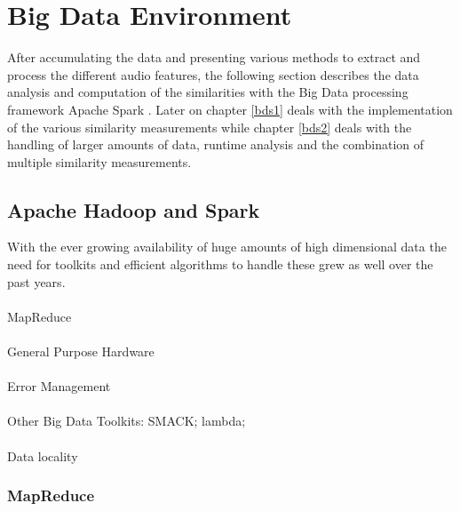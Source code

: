 
\section{Big Data Environment}\label{bdf}

After accumulating the data and presenting various methods to extract and process the different audio features, the following section describes the data analysis and computation of the similarities with the Big Data processing framework Apache Spark \cite{spark}. Later on chapter \ref{bds1} deals with the implementation of the various similarity measurements while chapter \ref{bds2} deals with the handling of larger amounts of data, runtime analysis and the combination of multiple similarity measurements. 

\subsection{Apache Hadoop and Spark} 

With the ever growing availability of huge amounts of high dimensional data the need for toolkits and efficient algorithms to handle these grew as well over the past years.\\
\ \\
MapReduce\\
\ \\
General Purpose Hardware\\
\ \\
Error Management\\
\ \\
Other Big Data Toolkits: SMACK; lambda;\\
\ \\
Data locality\\

\subsubsection{MapReduce}

